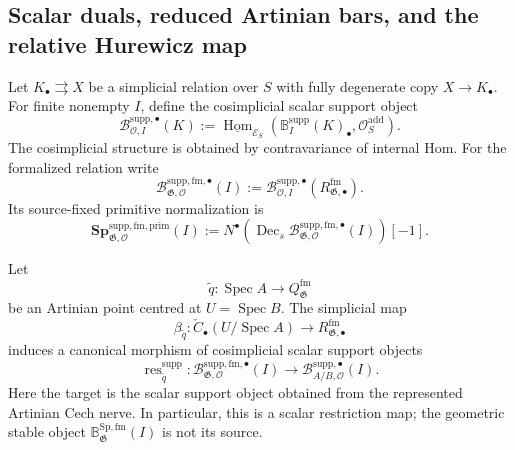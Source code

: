\subsection{Scalar duals, reduced Artinian bars, and the relative Hurewicz map}

\begin{definition}
\label{def:as-support-marked-scalar-dual}
Let $K_\bullet\rightrightarrows X$ be a simplicial relation over $S$ with
fully degenerate copy $X\to K_\bullet$.  For finite nonempty $I$, define the
cosimplicial scalar support object
\[
\boxed{
    \mathscr B^{\mathrm{supp},\bullet}_{\mathcal O,I}(K)
    :=
    \underline{\operatorname{Hom}}_{\mathcal E_S}
    \left(
        \mathbb B_I^{\mathrm{supp}}(K)_\bullet,
        \mathcal O_S^{\mathrm{add}}
    \right).
}
\]
The cosimplicial structure is obtained by contravariance of internal Hom.
For the formalized relation write
\[
    \mathscr B^{\mathrm{supp,fm},\bullet}_{\mathfrak G,\mathcal O}(I)
    :=
    \mathscr B^{\mathrm{supp},\bullet}_{\mathcal O,I}
    (R_{\mathfrak G,\bullet}^{\mathrm{fm}}).
\]
Its source-fixed primitive normalization is
\[
\boxed{
    \mathbf{Sp}^{\mathrm{supp,fm,prim}}_{\mathfrak G,\mathcal O}(I)
    :=
    N^\bullet
    \left(
        \operatorname{Dec}_s
        \mathscr B^{\mathrm{supp,fm},\bullet}_{\mathfrak G,\mathcal O}(I)
    \right)[-1].
}
\]
\end{definition}

\begin{proposition}
\label{prop:as-support-scalar-artinian-restriction}
Let
\[
    \widetilde q:\operatorname{Spec}A\longrightarrow
    Q_{\mathfrak G}^{\mathrm{fm}}
\]
be an Artinian point centred at $U=\operatorname{Spec}B$.  The simplicial map
\[
    \beta_{\widetilde q}:
    \check C_\bullet(U/\operatorname{Spec}A)
    \longrightarrow
    R_{\mathfrak G,\bullet}^{\mathrm{fm}}
\]
induces a canonical morphism of cosimplicial scalar support objects
\[
\boxed{
    \operatorname{res}^{\mathrm{supp}}_{\widetilde q}:
    \mathscr B^{\mathrm{supp,fm},\bullet}_{\mathfrak G,\mathcal O}(I)
    \longrightarrow
    \mathscr B^{\mathrm{supp},\bullet}_{A/B,\mathcal O}(I).
}
\]
Here the target is the scalar support object obtained from the represented
Artinian Cech nerve.  In particular, this is a scalar restriction map; the
geometric stable object
$\mathbb B_{\mathfrak G}^{\mathrm{Sp,fm}}(I)$ is not its source.
\end{proposition}

